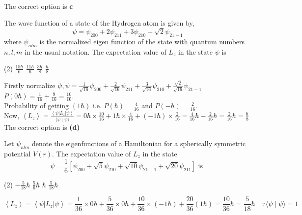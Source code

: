 \begin{enumerate}
\begin{answer}
	The correct option is \textbf{c}	
\end{answer}
\begin{minipage}{\textwidth}
	\item The wave function of a state of the Hydrogen atom is given by,
	$$
	\psi=\psi_{200}+2 \psi_{211}+3 \psi_{210}+\sqrt{2} \psi_{21-1}
	$$
	where $\psi_{n l m}$ is the normalized eigen function of the state with quantum numbers $n, l, m$ in the usual notation. The expectation value of $L_{z}$ in the state $\psi$ is
\end{minipage}
\begin{tasks}(2)
	\task[\textbf{A.}] $\frac{15 \hbar}{6}$
	\task[\textbf{B.}]$\frac{11 \hbar}{6}$
	\task[\textbf{C.}]$\frac{3 \hbar}{8}$
	\task[\textbf{D.}]$\frac{\hbar}{8}$
\end{tasks}
\begin{answer}
	Firstly normalize $\psi, \psi=\frac{1}{\sqrt{16}} \psi_{200}+\frac{2}{\sqrt{16}} \psi_{211}+\frac{3}{\sqrt{16}} \psi_{210}+\frac{\sqrt{2}}{\sqrt{16}} \psi_{21-1}$ \\
	$P(0 \hbar)=\frac{1}{16}+\frac{9}{16}=\frac{10}{16} .$\\
	Probability of getting $(1 \hbar)$ i.e. $P(\hbar)=\frac{4}{16}$ and $P(-\hbar)=\frac{2}{16}$.\\
	Now, $\left\langle L_{z}\right\rangle=\frac{\left\langle\psi\left|L_{z}\right| \psi\right\rangle}{\langle\psi \mid \psi\rangle}=0 \hbar \times \frac{10}{16}+1 \hbar \times \frac{4}{16}+(-1 \hbar) \times \frac{2}{16}=\frac{4}{16} \hbar-\frac{2}{16} \hbar=\frac{2}{16} \hbar=\frac{\hbar}{8}$\\
	The correct option is \textbf{(d)}	
\end{answer}
\begin{minipage}{\textwidth}
	\item Let $\psi_{n l m}$ denote the eigenfunctions of a Hamiltonian for a spherically symmetric potential $V(r)$. The expectation value of $L_{z}$ in the state
	$$\psi=\frac{1}{6}\left[\psi_{200}+\sqrt{5} \psi_{210}+\sqrt{10} \psi_{21-1}+\sqrt{20} \psi_{211}\right] \text { is }$$
\end{minipage}
\begin{tasks}(2)
	\task[\textbf{A.}] $-\frac{5}{18} \hbar$
	\task[\textbf{B.}]$\frac{5}{6} \hbar$
	\task[\textbf{C.}]$\hbar$
	\task[\textbf{D.}] $\frac{5}{18} \hbar$
\end{tasks}
\begin{answer}
	$$\left\langle L_{z}\right\rangle=\left\langle\psi\left|L_{z}\right| \psi\right\rangle=\frac{1}{36} \times 0 \hbar+\frac{5}{36} \times 0 \hbar+\frac{10}{36} \times(-1 \hbar)+\frac{20}{36}(1 \hbar)=\frac{10}{36} \hbar=\frac{5}{18} \hbar \quad \because\langle\psi \mid \psi\rangle=1$$\\

\end{answer}
\end{enumerate}
